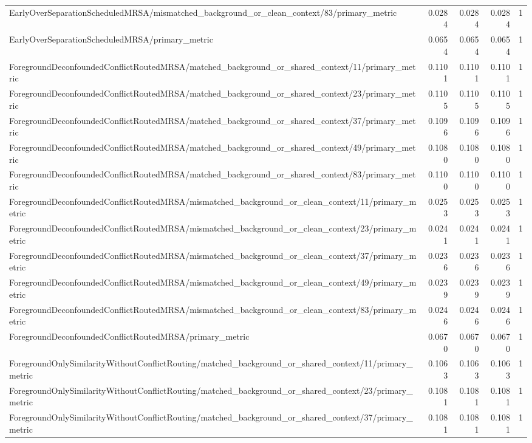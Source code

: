 \begin{table}[h]
\begin{tabular}{lrrrr}
EarlyOverSeparationScheduledMRSA/mismatched_background_or_clean_context/83/primary_metric & 0.0284 & 0.0284 & 0.0284 & 1 \\
EarlyOverSeparationScheduledMRSA/primary_metric & 0.0654 & 0.0654 & 0.0654 & 1 \\
ForegroundDeconfoundedConflictRoutedMRSA/matched_background_or_shared_context/11/primary_metric & 0.1101 & 0.1101 & 0.1101 & 1 \\
ForegroundDeconfoundedConflictRoutedMRSA/matched_background_or_shared_context/23/primary_metric & 0.1105 & 0.1105 & 0.1105 & 1 \\
ForegroundDeconfoundedConflictRoutedMRSA/matched_background_or_shared_context/37/primary_metric & 0.1096 & 0.1096 & 0.1096 & 1 \\
ForegroundDeconfoundedConflictRoutedMRSA/matched_background_or_shared_context/49/primary_metric & 0.1080 & 0.1080 & 0.1080 & 1 \\
ForegroundDeconfoundedConflictRoutedMRSA/matched_background_or_shared_context/83/primary_metric & 0.1100 & 0.1100 & 0.1100 & 1 \\
ForegroundDeconfoundedConflictRoutedMRSA/mismatched_background_or_clean_context/11/primary_metric & 0.0253 & 0.0253 & 0.0253 & 1 \\
ForegroundDeconfoundedConflictRoutedMRSA/mismatched_background_or_clean_context/23/primary_metric & 0.0241 & 0.0241 & 0.0241 & 1 \\
ForegroundDeconfoundedConflictRoutedMRSA/mismatched_background_or_clean_context/37/primary_metric & 0.0236 & 0.0236 & 0.0236 & 1 \\
ForegroundDeconfoundedConflictRoutedMRSA/mismatched_background_or_clean_context/49/primary_metric & 0.0239 & 0.0239 & 0.0239 & 1 \\
ForegroundDeconfoundedConflictRoutedMRSA/mismatched_background_or_clean_context/83/primary_metric & 0.0246 & 0.0246 & 0.0246 & 1 \\
ForegroundDeconfoundedConflictRoutedMRSA/primary_metric & 0.0670 & 0.0670 & 0.0670 & 1 \\
ForegroundOnlySimilarityWithoutConflictRouting/matched_background_or_shared_context/11/primary_metric & 0.1063 & 0.1063 & 0.1063 & 1 \\
ForegroundOnlySimilarityWithoutConflictRouting/matched_background_or_shared_context/23/primary_metric & 0.1081 & 0.1081 & 0.1081 & 1 \\
ForegroundOnlySimilarityWithoutConflictRouting/matched_background_or_shared_context/37/primary_metric & 0.1081 & 0.1081 & 0.1081 & 1 \\

\end{tabular}
\end{table}
